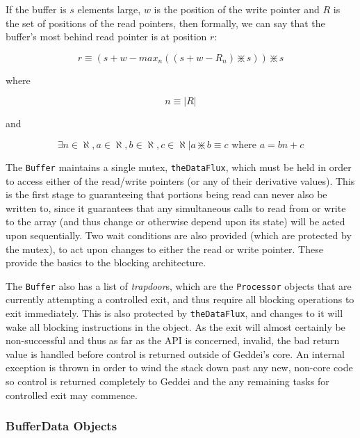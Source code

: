 If the buffer is $s$ elements large, $w$ is the position of the write pointer and $R$ is the set of positions of the read pointers, then formally, we can say that the buffer's most behind read pointer is at position $r$:

\begin{equation}
r \equiv (s + w - max_n ( ( s + w - R_n ) \divideontimes s ) ) \divideontimes s
\end{equation}

where

\begin{equation}
n \equiv \vert R \vert
\end{equation}

and

\begin{equation}\label{eqn:modulo}
\exists n \in \aleph, a \in \aleph, b \in \aleph, c \in \aleph | a \divideontimes b \equiv c \text{ where } a=bn+c
\end{equation}

The \texttt{Buffer} maintains a single mutex, \texttt{theDataFlux}, which must be held in order to access either of the read/write pointers (or any of their derivative values). This is the first stage to guaranteeing that portions being read can never also be written to, since it guarantees that any simultaneous calls to read from or write to the array (and thus change or otherwise depend upon its state) will be acted upon sequentially. Two wait conditions are also provided (which are protected by the mutex), to act upon changes to either the read or write pointer. These provide the basics to the blocking architecture.

The \texttt{Buffer} also has a list of \textit{trapdoor}s, which are the \texttt{Processor} objects that are currently attempting a controlled exit, and thus require all blocking operations to exit immediately. This is also protected by \texttt{theDataFlux}, and changes to it will wake all blocking instructions in the object. As the exit will almost certainly be non-successful and thus as far as the API is concerned, invalid, the bad return value is handled before control is returned outside of Geddei's core. An internal exception is thrown in order to wind the stack down past any new, non-core code so control is returned completely to Geddei and the any remaining tasks for controlled exit may commence.

\subsubsection{BufferData Objects}

